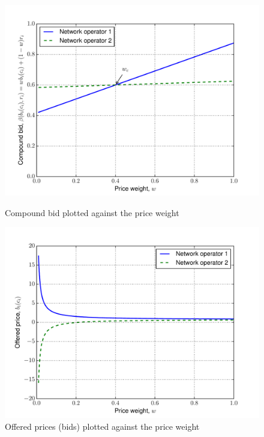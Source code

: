 \begin{figure}[p!]
	\includegraphics[width=\figsize]{Direct/Figures/pincomplete_bids_uc}
	\caption{Compound bid plotted against the price weight}
	\label{fig:pincomplete_bids_uc_direct}
	\vspace{10mm}
	\includegraphics[width=\figsize]{Direct/Figures/pincomplete_prices_uc}
	\caption{Offered prices (bids) plotted against the price weight}
	\label{fig:pincomplete_prices_uc_direct}
\end{figure}

